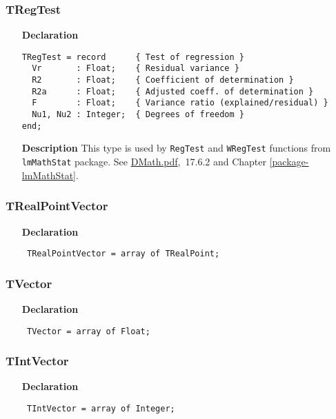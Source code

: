 \documentclass[12pt,a4paper,oneside]{report}
\newcommand{\lmath}[1]{   %
	\marginpar{\vspace{#1} 
		\begin{flushright}
			LMath
	\end{flushright} }
}
\newcommand{\declarationitem}[1]{\textbf{#1}}
\newcommand{\descriptiontitle}[1]{\textbf{#1}}
\newcommand{\code}[1]{\texttt{#1}}
\begin{document}
\subsubsection{TRegTest}\label{sec:tregtest}
\begin{itemize}
	\item[\declarationitem{Declaration}\hfill]
	\begin{verbatim}
TRegTest = record      { Test of regression }
  Vr       : Float;    { Residual variance }
  R2       : Float;    { Coefficient of determination }
  R2a      : Float;    { Adjusted coeff. of determination }
  F        : Float;    { Variance ratio (explained/residual) }
  Nu1, Nu2 : Integer;  { Degrees of freedom }
end;
	\end{verbatim}
	\item[\descriptiontitle{Description}]
This type is used by \code{RegTest} and \code{WRegTest} functions from \code{lmMathStat} package. See \href{DMath.pdf}{DMath.pdf},~17.6.2 and Chapter \ref{package-lmMathStat}.
\end{itemize}

\subsubsection{TRealPointVector}
\lmath{-24pt}
\label{utypes-TRealPointVector}
\begin{itemize}\item[\declarationitem{Declaration}\hfill]
	\begin{flushleft}
		\code{
			TRealPointVector =  array of TRealPoint;}
		
	\end{flushleft}
	
\end{itemize}
\subsubsection{TVector}
\label{utypes-TVector}
\begin{itemize}\item[\declarationitem{Declaration}\hfill]
	\begin{flushleft}
		\code{
			TVector     = array of Float;}
		
	\end{flushleft}
	
\end{itemize}
\subsubsection{TIntVector}
\label{utypes-TIntVector}
\begin{itemize}\item[\declarationitem{Declaration}\hfill]
	\begin{flushleft}
		\code{
			TIntVector  = array of Integer;}
		
	\end{flushleft}
	
\end{itemize}
\end{document}
